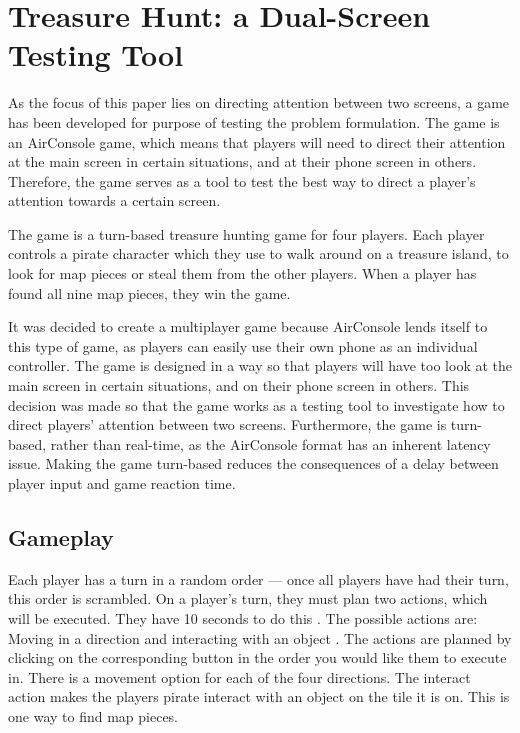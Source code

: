 \chapter{Treasure Hunt: a Dual-Screen Testing Tool}\label{ch:game}
 As the focus of this paper lies on directing attention between two screens, a game has been developed for purpose of testing the problem formulation. The game is an AirConsole game, which means that players will need to direct their attention at the main screen in certain situations, and at their phone screen in others. Therefore, the game serves as a tool to test the best way to direct a player's attention towards a certain screen.

The game is a turn-based treasure hunting game for four players. Each player controls a pirate character which they use to walk around on a treasure island, to look for map pieces or steal them from the other players. When a player has found all nine map pieces, they win the game.

It was decided to create a multiplayer game because AirConsole lends itself to this type of game, as players can easily use their own phone as an individual controller. The game is designed in a way so that players will have too look at the main screen in certain situations, and on their phone screen in others. This decision was made so that the game works as a testing tool to investigate how to direct players' attention between two screens. Furthermore, the game is turn-based, rather than real-time, as the AirConsole format has an inherent latency issue. Making the game turn-based reduces the consequences of a delay between player input and game reaction time. 

\section{Gameplay}
Each player has a turn in a random order --- once all players have had their turn, this order is scrambled. On a player's turn, they must plan two actions, which will be executed. They have 10 seconds to do this . The possible actions are: Moving in a direction and interacting with an object . The actions are planned by clicking on the corresponding button in the order you would like them to execute in. There is a movement option for each of the four directions. The interact action makes the players pirate interact with an object on the tile it is on. This is one way to find map pieces. 

